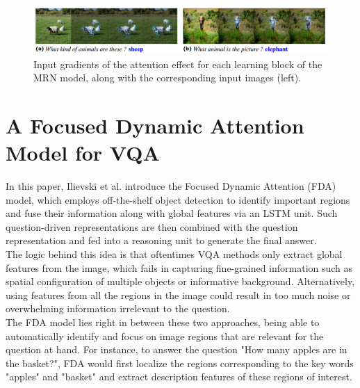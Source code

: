 \documentclass{article}
\begin{document}
    \begin{figure}[ht]
    	\centering
            \includegraphics[width=1.0\linewidth]{mrnMaps.PNG}
    	\caption{Input gradients of the attention effect for each learning block of the MRN model, along with the corresponding input images (left).}
    	\label{mrnMaps}
    \end{figure}

\section{A Focused Dynamic Attention Model for VQA}
In this paper, Ilievski et al. \citep{corrIlievski16} introduce the Focused Dynamic Attention (FDA) model, which employs off-the-shelf object detection to identify important regions and fuse their information along with global features via an LSTM unit. Such question-driven representations are then combined with the question representation and fed into a reasoning unit to generate the final answer.\\
The logic behind this idea is that oftentimes VQA methods only extract global features from the image, which fails in capturing fine-grained information such as spatial configuration of multiple objects or informative background. Alternatively, using features from all the regions in the image could result in too much noise or overwhelming information irrelevant to the question.\\
The FDA model lies right in between these two approaches, being able to automatically identify and focus on image regions that are relevant for the question at hand. For instance, to answer the question "How many apples are in the basket?", FDA would first localize the regions corresponding to the key words "apples" and "basket" and extract description features of these regions of interest.
\end{document}
